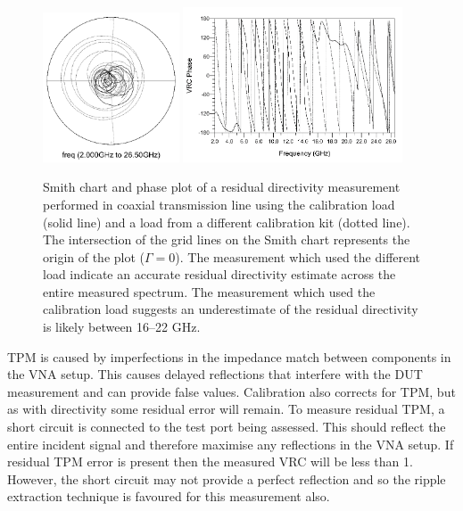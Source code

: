 \documentclass[../thesis/thesis.tex]{subfiles}
\begin{document}
\begin{refsection}
\begin{figure}
	\centering
	\includegraphics[width=0.36\textwidth]{dir_smith.png}
	\hfill
	\includegraphics[width=0.58\textwidth]{dir_xy.png}
	\caption{Smith chart and phase plot of a residual directivity measurement performed in coaxial transmission line using the calibration load (solid line) and a load from a different calibration kit (dotted line). The intersection of the grid lines on the Smith chart represents the origin of the plot ($\Gamma = 0$). The measurement which used the different load indicate an accurate residual directivity estimate across the entire measured spectrum. The measurement which used the calibration load suggests an underestimate of the residual directivity is likely between 16--22 GHz.}
	\label{ch4_fig_dir}
\end{figure}

TPM is caused by imperfections in the impedance match between components in the VNA setup. This causes delayed reflections that interfere with the DUT measurement and can provide false values. Calibration also corrects for TPM, but as with directivity some residual error will remain. To measure residual TPM, a short circuit is connected to the test port being assessed. This should reflect the entire incident signal and therefore maximise any reflections in the VNA setup. If residual TPM error is present then the measured VRC will be less than 1. However, the short circuit may not provide a perfect reflection and so the ripple extraction technique is favoured for this measurement also.


\end{refsection}
\end{document}
